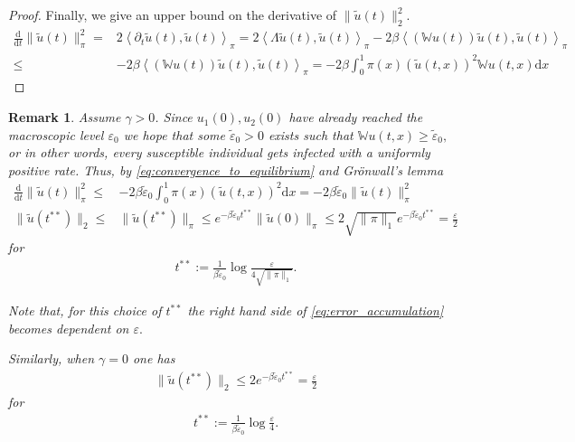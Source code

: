 \documentclass{article}
\renewcommand{\d}{\mathrm{d}}
\newcommand{\W}{\mathbb{W}}
\newcommand{\1}[1]{{\mathds{1}}_{\left\{#1\right\}}}
\newtheorem{remark}{Remark}
\begin{document}
\begin{proof}
	Finally, we give an upper bound on the derivative  of $\| \tilde{u}(t) \|_2^2.$
	\begin{align*}
		\frac{\d}{\d t} \| \tilde{u}(t) \|_\pi^2=& 2 \left \langle  \partial_t \tilde{u}(t),\tilde{u}(t) \right \rangle_{\pi}=2\left \langle \Lambda \tilde{u}(t),\tilde{u}(t) \right \rangle_\pi-2\beta\left \langle  (\W u(t)) \tilde{u}(t),\tilde{u}(t) \right \rangle_{\pi} \\
		\leq & -2\beta\left \langle  (\W u(t)) \tilde{u}(t),\tilde{u}(t) \right \rangle_{\pi}=-2 \beta \int_{0}^{1} \pi(x) \left( \tilde{u}(t,x) \right)^2 \W u(t,x) \d x
	\end{align*}
\end{proof}


\begin{remark}
\label{r:epsilon}
Assume $\gamma>0$. Since $u_1(0),u_2(0)$ have already reached the macroscopic level $\varepsilon_0$ we hope that some $\tilde{\varepsilon}_0>0$ exists such that $\W u(t,x) \geq \tilde{\varepsilon}_0,$ or in other words, every susceptible individual gets infected with a uniformly positive rate. Thus, by \eqref{eq:convergence_to_equilibrium} and Grönwall's lemma
\begin{align*}
\frac{\d}{\d t} \| \tilde{u}(t) \|_{\pi}^2 \leq& -2\beta \tilde{\varepsilon}_0 \int_{0}^{1} \pi(x) \left( \tilde{u}(t,x) \right)^2  \d x=-2\beta \tilde{\varepsilon}_0 \|\tilde{u}(t) \|_\pi^2 \\
\| \tilde{u}(t^{**}) \|_2 \leq & \| \tilde{u}(t^{**}) \|_\pi  \leq  e^{-\beta \tilde{\varepsilon}_0 t^{**}} \| \tilde{u}(0) \|_\pi \leq 2 \sqrt{\| \pi \|_1} e^{-\beta \tilde{\varepsilon}_0 t^{**}}=\frac{\varepsilon}{2}
\end{align*}
for
\begin{align}
\label{eq:t**}
t^{**}:=\frac{1}{\beta \tilde{\varepsilon}_0} \log \frac{\varepsilon}{4 \sqrt{\| \pi \|_1}}.
\end{align}

Note that, for this choice of $t^{**}$ the right hand side of \eqref{eq:error_accumulation} becomes dependent on $\varepsilon.$

Similarly, when $\gamma=0$ one has
\begin{align*}
	\|\tilde{u}(t^{**}) \|_2 \leq 2  e^{-\beta \tilde{\varepsilon}_0 t^{**}}=\frac{\varepsilon}{2} 
\end{align*}
for
\begin{align}
	\label{eq:t**'}
	t^{**}:=\frac{1}{\beta \tilde{\varepsilon}_0} \log \frac{\varepsilon}{4 }.
\end{align}
\end{remark}
\end{document}
